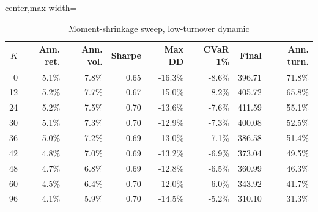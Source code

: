 ﻿\begin{table}[!htbp]
\centering
\caption{Moment-shrinkage sweep, low-turnover dynamic}
\label{tab:allocation-moment-shrinkage-low-turnover}
\small
\setlength{\tabcolsep}{5pt}
\renewcommand{\arraystretch}{1.12}
\begin{adjustbox}{center,max width=\linewidth}
\begin{tabular}{rrrrrrrr}
\toprule
$K$ & Ann. ret. & Ann. vol. & Sharpe & Max DD & CVaR 1\% & Final & Ann. turn. \\
\midrule
0 & 5.1\% & 7.8\% & 0.65 & -16.3\% & -8.6\% & 396.71 & 71.8\% \\
12 & 5.2\% & 7.7\% & 0.67 & -15.0\% & -8.2\% & 405.72 & 65.8\% \\
24 & 5.2\% & 7.5\% & 0.70 & -13.6\% & -7.6\% & 411.59 & 55.1\% \\
30 & 5.1\% & 7.3\% & 0.70 & -12.9\% & -7.3\% & 400.08 & 52.5\% \\
36 & 5.0\% & 7.2\% & 0.69 & -13.0\% & -7.1\% & 386.58 & 51.4\% \\
42 & 4.8\% & 7.0\% & 0.69 & -13.2\% & -6.9\% & 373.04 & 49.5\% \\
48 & 4.7\% & 6.8\% & 0.69 & -12.8\% & -6.5\% & 360.99 & 46.3\% \\
60 & 4.5\% & 6.4\% & 0.70 & -12.0\% & -6.0\% & 343.92 & 41.7\% \\
96 & 4.1\% & 5.9\% & 0.70 & -14.5\% & -5.2\% & 310.10 & 31.3\% \\
\bottomrule
\end{tabular}
\end{adjustbox}
\end{table}
